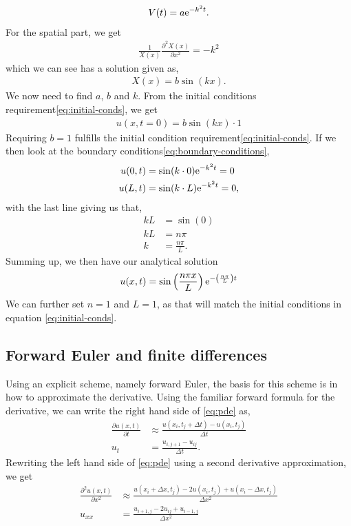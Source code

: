 \begin{align*}
    V(t) = a \mathrm{e}^{-k^2t}.
\end{align*}
For the spatial part, we get
\begin{align}
    \frac{1}{X(x)}\frac{\partial^2 X(x)}{\partial x^2} = -k^2
    \label{eq:pde-temporal-general}
\end{align}
which we can see has a solution given as\cite{boas_mathematical_2006},
\begin{align}
    X(x) = b\sin(kx).
    \label{eq:pde-spatial-general}
\end{align}
We now need to find $a$, $b$ and $k$. From the initial conditions requirement\eqref{eq:initial-conds}, we get
\begin{align*}
    u(x,t=0) = b\sin(kx) \cdot 1
\end{align*}
Requiring $b=1$ fulfills the initial condition requirement\eqref{eq:initial-conds}. If we then look at the boundary conditions\eqref{eq:boundary-conditions},
\begin{align*}
    u(0,t) &= \sin(k\cdot 0)\mathrm{e}^{-k^2t} = 0 \\
    u(L,t) &= \sin(k\cdot L)\mathrm{e}^{-k^2t} = 0,
\end{align*}
with the last line giving us that,
\begin{align*}
    kL &= \sin (0) \\
    kL &= n \pi \\
    k &= \frac{n\pi}{L}.
\end{align*}
Summing up, we then have our analytical solution
\begin{align}
    u(x,t) = \sin\left(\frac{n\pi x}{L}\right)\mathrm{e}^{-\left(\frac{n\pi}{L}\right)t}
    \label{eq:pde-analytical-solution}
\end{align}
We can further set $n=1$ and $L=1$, as that will match the initial conditions in equation \eqref{eq:initial-conds}.

\subsection{Forward Euler and finite differences}
Using an explicit scheme, namely forward Euler\citep[ch. 10.2.2]{hjorth-jensen_computational_2015}, the basis for this scheme is in how to approximate the derivative. Using the familiar forward formula for the derivative, we can write the right hand side of \eqref{eq:pde} as,
\begin{align*}
    \frac{\partial u(x,t)}{\partial t} &\approx \frac{u(x_i, t_j + \Delta t) - u(x_i, t_j)}{\Delta t} \\
    u_t &= \frac{u_{i,j+1} - u_{ij}}{\Delta t}.
\end{align*}
Rewriting the left hand side of \eqref{eq:pde} using a second derivative approximation, we get
\begin{align*}
\frac{\partial^2 u(x,t)}{\partial x^2} &\approx \frac{u(x_i+\Delta x,t_j) - 2u(x_i,t_j) + u(x_i-\Delta x, t_j)}{\Delta x^2} \\
u_{xx} &= \frac{u_{i+1,j} - 2u_{ij} + u_{i-1,j}}{\Delta x^2}
\end{align*}

